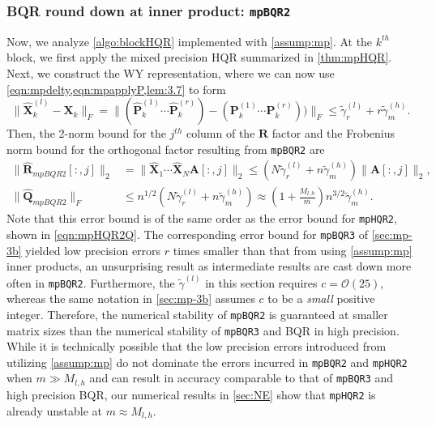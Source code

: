 \documentclass[review,onefignum,onetabnum]{siamart190516}
\newcommand{\bb}[1]{\mathbf{#1}}
\newcommand{\cO}{\mathcal{O}}
\begin{document}
\subsubsection{BQR round down at inner product: {\tt mpBQR2}}
Now, we analyze \cref{algo:blockHQR} implemented with \cref{assump:mp}. 
At the $k^{th}$ block, we first apply the mixed precision HQR summarized in \cref{thm:mpHQR}.
Next, we construct the WY representation, where we can now use \cref{eqn:mpdelty,eqn:mpapplyP,lem:3.7} to form
\begin{equation}
\|\hat{\bb{X}}_{k}^{(l)}- \bb{X}_k\|_F = \|(\hat{\bb{P}}_k^{(1)}\cdots \hat{\bb{P}}_k^{(r)})-(\bb{P}_k^{(1)}\cdots \bb{P}_k^{(r)}))\|_F \leq \tilde{\gamma}_{r}^{(l)} + r\tilde{\gamma}_{m}^{(h)}.
\end{equation}
Then, the 2-norm bound for the $j^{th}$ column of the $\bb{R}$ factor and the Frobenius norm bound for the orthogonal factor resulting from {\tt mpBQR2} are
\begin{align}
\|\hat{\bb{R}}_{mpBQR2}[:,j]\|_2 &= \|\hat{\bb{X}}_1\cdots\hat{\bb{X}}_N\bb{A}[:,j]\|_2\leq\left( N\tilde{\gamma}_{r}^{(l)} + n\tilde{\gamma}_{m}^{(h)}\right)\|\bb{A}[:,j]\|_2,\\
\|\hat{\bb{Q}}_{mpBQR2}\|_F &\leq n^{1/2}\left(N\tilde{\gamma}_{r}^{(l)} + n\tilde{\gamma}_{m}^{(h)}\right) \approx \left(1+\frac{M_{l,h}}{m}\right)n^{3/2}\tilde{\gamma}_{m}^{(h)}. \label{eqn:mpBQR2}
\end{align}
Note that this error bound is of the same order as the error bound for {\tt mpHQR2}, shown in \cref{eqn:mpHQR2Q}.
The corresponding error bound for {\tt mpBQR3} of \cref{sec:mp-3b} yielded low precision errors $r$ times smaller than that from 
using \cref{assump:mp} inner products,
an unsurprising result as intermediate results are cast down more often in {\tt mpBQR2}.
Furthermore, the $\tilde{\gamma}^{(l)}$ in this section requires $c=\cO(25)$, whereas the same notation in \cref{sec:mp-3b} assumes $c$ to be a \emph{small} positive integer.
Therefore, the numerical stability of {\tt mpBQR2} is guaranteed at smaller matrix sizes than the numerical stability of {\tt mpBQR3} and BQR in high precision.
While it is technically possible that the low precision errors introduced from utilizing \cref{assump:mp} do not dominate the errors incurred in {\tt mpBQR2} and {\tt mpHQR2} when $m\gg M_{l,h}$ and can result in accuracy comparable to that of {\tt mpBQR3} and high precision BQR, our numerical results in \cref{sec:NE} show that {\tt mpHQR2} is already unstable at $m\approx M_{l,h}$.
\end{document}
